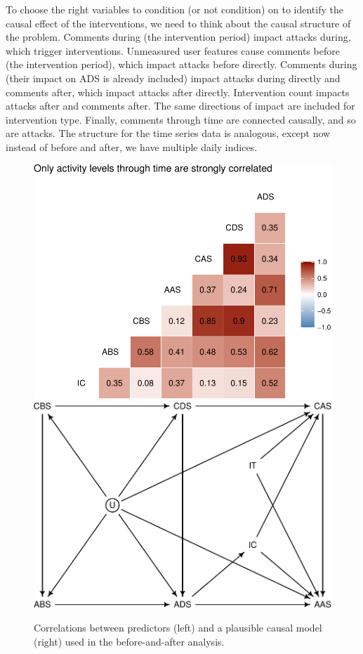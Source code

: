 \documentclass[preprint,12pt]{elsarticle}
\begin{document}
To choose the right variables to condition (or not condition) on to
identify the causal effect of the interventions, we need to think about
the causal structure of the problem. Comments during (the intervention period) impact attacks
during, which trigger interventions. Unmeasured user features cause
comments before (the intervention period), which impact attacks before directly. Comments during
(their impact on ADS is already included) impact attacks during directly
and comments after, which impact attacks after
directly. Intervention count impacts attacks after and comments after.
The same directions of impact are included for intervention type.
Finally, comments through time are connected causally, and so are
attacks. The structure for the time series data is analogous, except now
instead of before and after, we have multiple daily indices.



\begin{figure}

\begin{center}\includegraphics[width=0.48\linewidth]{figures/correlations-1} \includegraphics[width=0.48\linewidth]{figures/correlations-2} \end{center}

\caption{Correlations between predictors (left) and a plausible causal model (right) used in the before-and-after analysis.}
\label{fig:correlations}
\end{figure}
\end{document}
